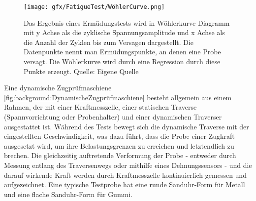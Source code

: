 \begin{figure}[htbp]
 \centering
 \texttt{[image: gfx/FatigueTest/WöhlerCurve.png]}
 \caption[Wöhlerkurve in Ermüdungstests]{Das Ergebnis eines Ermüdungstests wird in Wöhlerkurve Diagramm mit y Achse als die zyklische Spannungsamplitude und x Achse als die Anzahl der Zyklen bis zum Versagen dargestellt. Die Datenpunkte nennt man Ermüdungspunkte, an denen eine Probe versagt. Die Wöhlerkurve wird durch eine Regression durch diese Punkte erzeugt. Quelle: Eigene Quelle}
 \label{fig:background:Lebensdauer-Kurven}
\end{figure}

Eine dynamische Zugprüfmaschiene \ref{fig:background:DynamischeZugprüfmaschiene} besteht allgemein aus einem Rahmen, der mit einer Kraftmesszelle, einer statischen Traverse (Spannvorrichtung oder Probenhalter) und einer dynamischen Traverser ausgestattet ist. Während des Tests  bewegt sich die dynamische Traverse mit der eingestellten Geschwindigkeit, was dazu führt, dass die Probe einer Zugkraft ausgesetzt wird, um ihre Belastungsgrenzen zu erreichen und letztendlich zu brechen. Die gleichzeitig auftretende Verformung der Probe - entweder durch Messung entlang des Traversenwegs oder mithilfe eines Dehnungssensors - und die darauf wirkende Kraft werden durch Kraftmesszelle kontinuierlich gemessen und aufgezeichnet. Eine typische Testprobe hat eine runde Sanduhr-Form für Metall und eine flache Sanduhr-Form für Gummi.

